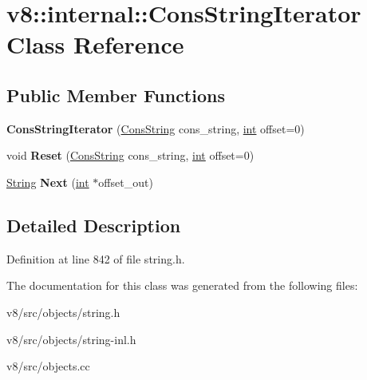 \hypertarget{classv8_1_1internal_1_1ConsStringIterator}{}\section{v8\+:\+:internal\+:\+:Cons\+String\+Iterator Class Reference}
\label{classv8_1_1internal_1_1ConsStringIterator}
\subsection*{Public Member Functions}
\begin{DoxyCompactItemize}
\item 
\mbox{\label{classv8_1_1internal_1_1ConsStringIterator_a29035b42ea574997ef928d240a671e67}} 
{\bfseries Cons\+String\+Iterator} (\mbox{\hyperlink{classv8_1_1internal_1_1ConsString}{Cons\+String}} cons\+\_\+string, \mbox{\hyperlink{classint}{int}} offset=0)
\item 
\mbox{\label{classv8_1_1internal_1_1ConsStringIterator_a6d799a2f88fa75c7f7fadefa3963c248}} 
void {\bfseries Reset} (\mbox{\hyperlink{classv8_1_1internal_1_1ConsString}{Cons\+String}} cons\+\_\+string, \mbox{\hyperlink{classint}{int}} offset=0)
\item 
\mbox{\label{classv8_1_1internal_1_1ConsStringIterator_a72485575b6119b229a596f082870e46e}} 
\mbox{\hyperlink{classv8_1_1internal_1_1String}{String}} {\bfseries Next} (\mbox{\hyperlink{classint}{int}} $\ast$offset\+\_\+out)
\end{DoxyCompactItemize}


\subsection{Detailed Description}


Definition at line 842 of file string.\+h.



The documentation for this class was generated from the following files\+:\begin{DoxyCompactItemize}
\item 
v8/src/objects/string.\+h\item 
v8/src/objects/string-\/inl.\+h\item 
v8/src/objects.\+cc\end{DoxyCompactItemize}

